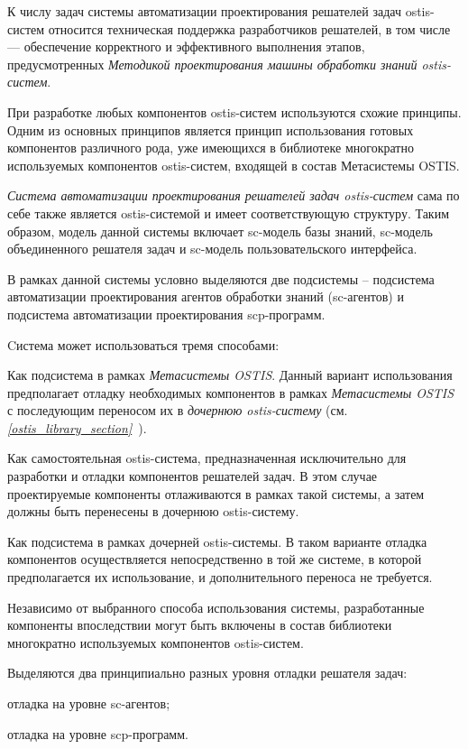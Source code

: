 К числу задач системы автоматизации проектирования решателей задач ostis-систем относится техническая поддержка разработчиков решателей, в том числе --- обеспечение корректного и эффективного выполнения этапов, предусмотренных \textit{Методикой проектирования машины обработки знаний ostis-систем}.

При разработке любых компонентов ostis-систем используются схожие принципы. Одним из основных принципов является принцип использования готовых компонентов различного рода, уже имеющихся в библиотеке многократно используемых компонентов ostis-систем, входящей в состав Метасистемы OSTIS.

\textit{Система автоматизации проектирования решателей задач ostis-систем} сама по себе также является ostis-системой и имеет соответствующую структуру. Таким образом, модель данной системы включает sc-модель базы знаний, sc-модель объединенного решателя задач и sc-модель пользовательского интерфейса.

В рамках данной системы условно выделяются две подсистемы -- подсистема автоматизации проектирования агентов обработки знаний (sc-агентов) и подсистема автоматизации проектирования scp-программ.

Cистема может использоваться тремя способами:
\begin{textitemize}
    \item Как подсистема в рамках \textit{Метасистемы OSTIS}. Данный вариант использования предполагает отладку необходимых компонентов в рамках \textit{Метасистемы OSTIS} с последующим переносом их в \textit{дочернюю ostis-систему} (см. \textit{\ref{ostis_library_section}~}).
    \item Как самостоятельная ostis-система, предназначенная исключительно для разработки и отладки компонентов решателей задач. В этом случае проектируемые компоненты отлаживаются в рамках такой системы, а затем должны быть перенесены в дочернюю ostis-систему.
    \item Как подсистема в рамках дочерней ostis-системы. В таком варианте отладка компонентов осуществляется непосредственно в той же системе, в которой предполагается их использование, и дополнительного переноса не требуется.
\end{textitemize}

Независимо от выбранного способа использования системы, разработанные компоненты впоследствии могут быть включены в состав библиотеки многократно используемых компонентов ostis-систем.

Выделяются два принципиально разных уровня отладки решателя задач:
\begin{textitemize}
    \item отладка на уровне sc-агентов;
    \item отладка на уровне scp-программ.
\end{textitemize}

